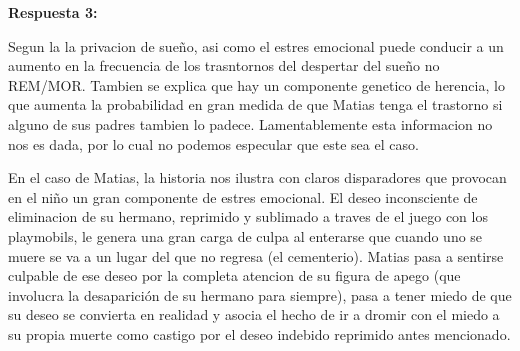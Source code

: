 \documentclass[12pt,a4paper]{article}
\begin{document}
\textbf{Respuesta 3:}

Segun la \textcite[p.401]{dsm} la privacion de sueño, asi como el estres emocional puede conducir a un aumento en la frecuencia de los trasntornos del despertar del sueño no REM/MOR. Tambien se explica que hay un componente genetico de herencia, lo que aumenta la probabilidad en gran medida de que Matias tenga el trastorno si alguno de sus padres tambien lo padece. Lamentablemente esta informacion no nos es dada, por lo cual no podemos especular que este sea el caso. 

En el caso de Matias, la historia nos ilustra con claros disparadores que provocan en el niño un gran componente de estres emocional. El deseo inconsciente de eliminacion de su hermano, reprimido y sublimado a traves de el juego con los playmobils, le genera una gran carga de culpa al enterarse que cuando uno se muere se va a un lugar del que no regresa (el cementerio). Matias pasa a sentirse culpable de ese deseo por la completa atencion de su figura de apego (que involucra la desaparición de su hermano para siempre), pasa a tener miedo de que su deseo se convierta en realidad y asocia el hecho de ir a dromir con el miedo a su propia muerte como castigo por el deseo indebido reprimido antes mencionado. 

\newpage
\end{document}

